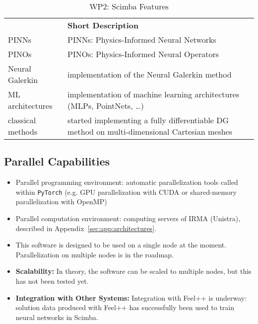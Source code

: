\begin{table}[h!]
    \centering
    {
        \setlength{\parindent}{0pt}
        \def\arraystretch{1.25}
        {
            \fontsize{9}{11}\selectfont
            \begin{tabular}{!{\color{numpexgray}\vrule}p{.25\linewidth}!{\color{numpexgray}\vrule}p{.6885\linewidth}!{\color{numpexgray}\vrule}}
                 & {\rule{0pt}{2.5ex}\color{white}\bf Short Description } \\
                    PINNs
                 & PINNs: Physics-Informed Neural Networks                \\
                    PINOs
                 & PINOs: Physics-Informed Neural Operators               \\
                    Neural Galerkin
                 & implementation of the Neural Galerkin method           \\
                 ML architectures
                 & implementation of machine learning architectures
                (MLPs, PointNets, \dots)                                  \\
                 classical methods
                 & started implementing a fully differentiable
                DG method on multi-dimensional Cartesian meshes           \\
            \end{tabular}
        }
    }
    \caption{WP2: Scimba Features}
    \label{tab:WP2:Scimba:features}
\end{table}


\subsection{Parallel Capabilities}
\label{sec:WP2:Scimba:performances}

\begin{itemize}
    \item Parallel programming environment:
          automatic parallelization tools called within \texttt{PyTorch}
          (e.g. GPU parallelization with CUDA or shared-memory parallelization with OpenMP)
    \item Parallel computation environment: computing servers of IRMA (Unistra), described in Appendix~\ref{sec:app:architectures}.
    \item This software is designed to be used on a single node at the moment.
          Parallelization on multiple nodes is in the roadmap.
    \item \textbf{Scalability:}
          In theory, the software can be scaled to multiple nodes, but this has not been tested yet.
    \item \textbf{Integration with Other Systems:}
          Integration with Feel++ is underway:
          solution data produced with Feel++ has successfully been
          used to train neural networks in Scimba.
\end{itemize}


